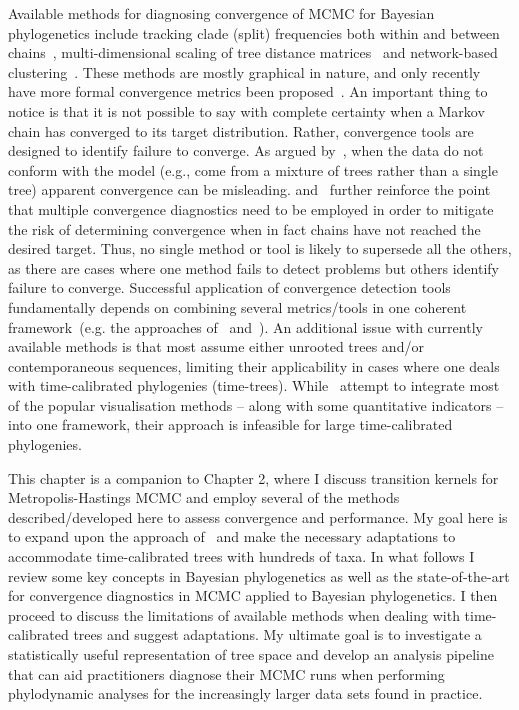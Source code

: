 Available methods for diagnosing convergence of MCMC for Bayesian phylogenetics include tracking clade (split) frequencies both within and between chains~\citep{Nylander2008}, multi-dimensional scaling of tree distance matrices~\citep{Hillis2005,Matsen2006} and network-based clustering~\citep{Whidden2015}. 
These methods are mostly graphical in nature, and only recently have more formal convergence metrics been proposed~\citep{Whidden2015,Lanfear2016}.
An important thing to notice is that it is not possible to say with complete certainty when a Markov chain has converged to its target distribution.
Rather, convergence tools are designed to identify failure to converge.
As argued by~\cite{Mossel2005}, when the data do not conform with the model (e.g., come from a mixture of trees rather than a single tree) apparent convergence can be misleading.
\cite{Cowles1996} and~\cite{Brooks1998} further reinforce the point that multiple convergence diagnostics need to be employed in order to mitigate the risk of determining convergence when in fact chains have not reached the desired target.
Thus, no single method or tool is likely to supersede all the others, as there are cases where one method fails to detect problems but others identify failure to converge. 
Successful application of convergence detection tools fundamentally depends on combining several metrics/tools in one coherent framework~(e.g. the approaches of~\cite{Nylander2008} and~\cite{Lanfear2016}).
An additional issue with currently available methods is that most assume either unrooted trees and/or contemporaneous sequences, limiting their applicability in cases where one deals with time-calibrated phylogenies (time-trees).
While~\cite{Warren2017} attempt to integrate most of the popular visualisation methods -- along with some quantitative indicators -- into one framework, their approach is infeasible for large time-calibrated phylogenies.

This chapter is a companion to Chapter 2, where I discuss transition kernels for Metropolis-Hastings MCMC and employ several of the methods described/developed here to assess convergence and performance.
My goal here is to expand upon the approach of~\cite{Warren2017} and make the necessary adaptations to accommodate time-calibrated trees with hundreds of taxa.
In what follows I review  some key concepts in Bayesian phylogenetics as well as the state-of-the-art for convergence diagnostics in MCMC applied to Bayesian phylogenetics.
I then proceed to discuss the limitations of available methods when dealing with time-calibrated trees and suggest adaptations.
My ultimate goal is to investigate a statistically useful representation of tree space and develop an analysis pipeline that can aid practitioners diagnose their MCMC runs when performing phylodynamic analyses for the increasingly larger data sets found in practice.

